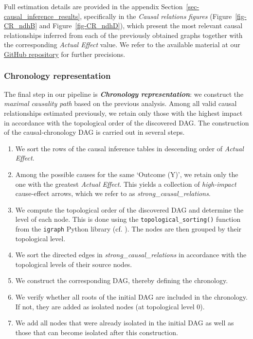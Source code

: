 \documentclass[
]{article}
\theoremstyle{definition}
\theoremstyle{remark}
\begin{document}
Full estimation details are provided in the appendix
Section~\ref{sec-causal_inference_results}, specifically in the
\emph{Causal relations figures} (Figure~\ref{fig-CR_ndhB} and
Figure~\ref{fig-CR_ndhD}), which present the most relevant causal
relationships inferred from each of the previously obtained graphs
together with the corresponding \emph{Actual Effect} value. We refer to
the available material at our
\href{https://github.com/rmartosprieto/chloroDAG.git}{GitHub repository}
for further precisions.

\subsubsection{Chronology
representation}\label{chronology-representation}

The final step in our pipeline is \textbf{\emph{Chronology
representation}}: we construct the \emph{maximal causality path} based
on the previous analysis. Among all valid causal relationships estimated
previously, we retain only those with the highest impact in accordance
with the topological order of the discovered DAG. The construction of
the causal-chronology DAG is carried out in several steps.

\begin{enumerate}
\def\labelenumi{\roman{enumi}.}
\item
  We sort the rows of the causal inference tables in descending order of
  \emph{Actual Effect}.
\item
  Among the possible causes for the same `Outcome (Y)', we retain only
  the one with the greatest \emph{Actual Effect}. This yields a
  collection of \emph{high-impact} cause-effect arrows, which we refer
  to as \emph{strong\_causal\_relations}.
\item
  We compute the topological order of the discovered DAG and determine
  the level of each node. This is done using the
  \texttt{topological\_sorting()} function from the \texttt{igraph}
  Python library (cf. ). The nodes
  are then grouped by their topological level.
\item
  We sort the directed edges in \emph{strong\_causal\_relations} in
  accordance with the topological levels of their source nodes.
\item
  We construct the corresponding DAG, thereby defining the chronology.
\item
  We verify whether all roots of the initial DAG are included in the
  chronology. If not, they are added as isolated nodes (at topological
  level \(0\)).
\item
  We add all nodes that were already isolated in the initial DAG as well
  as those that can become isolated after this construction.
\end{enumerate}
\end{document}
